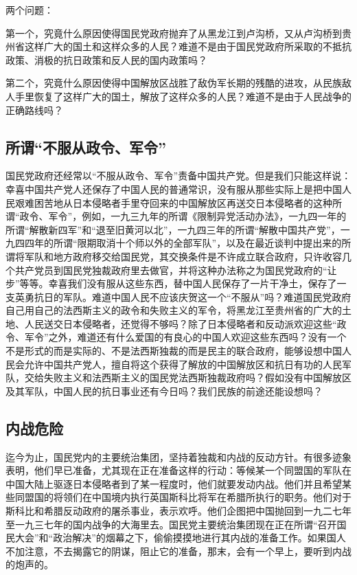 两个问题：

第一个，究竟什么原因使得国民党政府抛弃了从黑龙江到卢沟桥，又从卢沟桥到贵州省这样广大的国土和这样众多的人民？难道不是由于国民党政府所采取的不抵抗政策、消极的抗日政策和反人民的国内政策吗？

第二个，究竟什么原因使得中国解放区战胜了敌伪军长期的残酷的进攻，从民族敌人手里恢复了这样广大的国土，解放了这样众多的人民？难道不是由于人民战争的正确路线吗？

\subsection{所谓“不服从政令、军令”}

国民党政府还经常以“不服从政令、军令”责备中国共产党。但是我们只能这样说：幸喜中国共产党人还保存了中国人民的普通常识，没有服从那些实际上是把中国人民艰难困苦地从日本侵略者手里夺回来的中国解放区再送交日本侵略者的这种所谓“政令、军令”，例如，一九三九年的所谓《限制异党活动办法》，一九四一年的所谓“解散新四军”和“退至旧黄河以北”，一九四三年的所谓“解散中国共产党”，一九四四年的所谓“限期取消十个师以外的全部军队”，以及在最近谈判中提出来的所谓将军队和地方政府移交给国民党，其交换条件是不许成立联合政府，只许收容几个共产党员到国民党独裁政府里去做官，并将这种办法称之为国民党政府的“让步”等等。幸喜我们没有服从这些东西，替中国人民保存了一片干净土，保存了一支英勇抗日的军队。难道中国人民不应该庆贺这一个“不服从”吗？难道国民党政府自己用自己的法西斯主义的政令和失败主义的军令，将黑龙江至贵州省的广大的土地、人民送交日本侵略者，还觉得不够吗？除了日本侵略者和反动派欢迎这些“政令、军令”之外，难道还有什么爱国的有良心的中国人欢迎这些东西吗？没有一个不是形式的而是实际的、不是法西斯独裁的而是民主的联合政府，能够设想中国人民会允许中国共产党人，擅自将这个获得了解放的中国解放区和抗日有功的人民军队，交给失败主义和法西斯主义的国民党法西斯独裁政府吗？假如没有中国解放区及其军队，中国人民的抗日事业还有今日吗？我们民族的前途还能设想吗？

\subsection{内战危险}

迄今为止，国民党内的主要统治集团，坚持着独裁和内战的反动方针。有很多迹象表明，他们早已准备，尤其现在正在准备这样的行动：等候某一个同盟国的军队在中国大陆上驱逐日本侵略者到了某一程度时，他们就要发动内战。他们并且希望某些同盟国的将领们在中国境内执行英国斯科比将军在希腊所执行的职务。他们对于斯科比和希腊反动政府的屠杀事业，表示欢呼。他们企图把中国抛回到一九二七年至一九三七年的国内战争的大海里去。国民党主要统治集团现在正在所谓“召开国民大会”和“政治解决”的烟幕之下，偷偷摸摸地进行其内战的准备工作。如果国人不加注意，不去揭露它的阴谋，阻止它的准备，那末，会有一个早上，要听到内战的炮声的。

